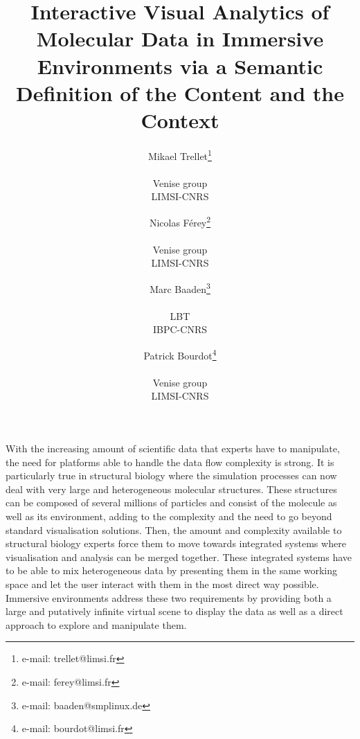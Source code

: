 \documentclass{vgtc}                          %
\title{Interactive Visual Analytics of Molecular Data in Immersive Environments via a Semantic Definition of the Content and the Context}
\author{Mikael Trellet\thanks{e-mail: trellet@limsi.fr}\\ %
      \parbox{1.4in}{\scriptsize \centering Venise group \\ LIMSI-CNRS }%
\and Nicolas Férey\thanks{e-mail: ferey@limsi.fr}\\ %
     \parbox{1.4in}{\scriptsize \centering Venise group \\ LIMSI-CNRS }%
\and Marc Baaden\thanks{e-mail: baaden@smplinux.de}\\ %
     \parbox{1.4in}{\scriptsize \centering LBT \\ IBPC-CNRS}
\and Patrick Bourdot\thanks{e-mail: bourdot@limsi.fr}\\ %
     \parbox{1.4in}{\scriptsize \centering Venise group \\ LIMSI-CNRS }}%
\begin{document}


\maketitle



With the increasing amount of scientific data that experts have to manipulate, the need for platforms able to handle the data flow complexity is strong. It is particularly true in structural biology where the simulation processes can now deal with very large and heterogeneous molecular structures. These structures can be composed of several millions of particles and consist of the molecule as well as its environment, adding to the complexity and the need to go beyond standard visualisation solutions.
Then, the amount and complexity available to structural biology experts force them to move towards integrated systems where visualisation and analysis can be merged together. These integrated systems have to be able to mix heterogeneous data by presenting them in the same working space and let the user interact with them in the most direct way possible. Immersive environments address these two requirements by providing both a large and putatively infinite virtual scene to display the data as well as a direct approach to explore and manipulate them.
\end{document}
